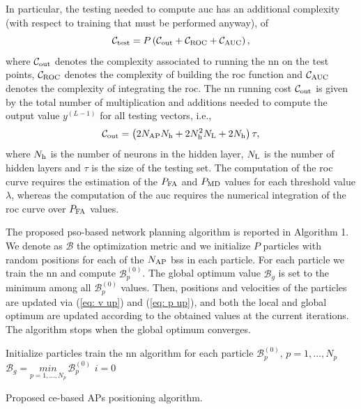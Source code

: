 \documentclass[conference,final]{IEEEtran}
\begin{document}
In particular, the testing needed to compute \ac{auc} has an additional complexity (with respect to training that must be performed anyway), of 
\begin{equation}
    \mathcal{C}_{\rm test} = P \left( \mathcal{C}_{\rm out}+\mathcal{C}_{\rm ROC}+\mathcal{C}_{\rm AUC}\right),
\end{equation}
where  $\mathcal{C}_{\rm out}$ denotes the complexity associated to running the \ac{nn} on the test points, $\mathcal{C}_{\rm ROC}$ denotes the complexity of building the \ac{roc} function and $\mathcal{C}_{\rm AUC}$ denotes the complexity of integrating the \ac{roc}. The \ac{nn} running cost $\mathcal{C}_{\rm out}$ is given by the total number of multiplication and additions needed to compute the output value $y^{(L-1)}$ for all testing vectors, i.e.,
\begin{equation}
    \mathcal{C}_{\rm out} = \left(2N_{\rm AP}N_{\rm h}+2N_{\rm h}^2N_{\rm L} + 2N_{\rm h}\right)\tau ,
\end{equation}
where $N_{\rm h}$ is the number of neurons in the hidden layer, $N_{\rm L}$ is the number of hidden layers and $\tau$ is the size of the testing set.
The computation of the \ac{roc} curve requires the estimation of the $P_{\rm FA}$ and $P_{\rm MD}$ values for each threshold value $\lambda$, whereas the computation of the \ac{auc} requires the numerical integration of the \ac{roc} curve over $P_{\rm FA}$ values.

The proposed \ac{pso}-based network planning algorithm is reported in Algorithm 1. We denote as $\mathcal{B}$ the optimization metric and we initialize $P$ particles with random positions for each of the $N_{\rm AP}$ \acp{bs} in each particle. For each particle we train the \ac{nn} and compute $\mathcal{B}_p^{(0)}$. The global optimum value $\mathcal{B}_g$ is set to the minimum among all $\mathcal{B}_p^{(0)}$ values. Then, positions and velocities of the particles are updated via (\ref{eq: v up}) and (\ref{eq: p up}), and both the local and global optimum are updated according to the obtained values at the current iterations. The algorithm stops when the global optimum converges.

 \begin{algorithm}[b!]

\small

  Initialize particles\;
  train the \ac{nn} algorithm for each particle\;
  $\mathcal{B}_p^{(0)}$, $p=1,...,N_p$\;
  $\mathcal{B}_g=\underset{p=1,...,N_p}{min} \, \mathcal{B}_p^{(0)}$\;
  $i = 0$\;

      
\caption{Proposed \ac{ce}-based APs positioning algorithm.}
 \end{algorithm}      
\end{document}

